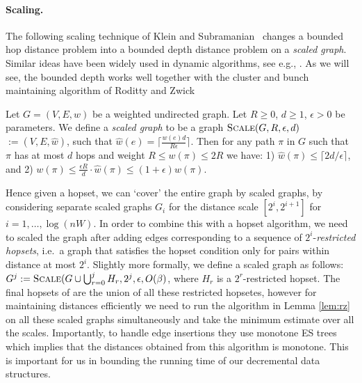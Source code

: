 \paragraph{Scaling.}
The following scaling technique of Klein and Subramanian~\cite{KS97} changes a bounded hop distance problem into a bounded depth distance problem on a \textit{scaled graph}. Similar ideas have been widely used in dynamic algorithms, see e.g., \cite{Bernstein09,BR11,henzinger2014decremental,LN2020}. As we will see, the bounded depth works well together with the cluster and bunch maintaining algorithm of Roditty and Zwick~\cite{RZ12}
\begin{lemma}[\cite{KS97}]\label{lem:rounding}
Let $G=(V,E,w)$ be a weighted undirected graph. Let $R \geq 0$, $d \geq 1$, $\epsilon > 0$ be parameters.
We define a \emph{scaled graph} to be a graph $\textsc{Scale}(G, R, \epsilon, d)$ $:=  (V, E, \hat{w})$, such that $\hat{w}(e) = \lceil \tfrac{w(e)d}{R \epsilon} \rceil$.
Then for any path $\pi$ in $G$ such that $\pi$ has at most $d$ hops and weight $R \leq w(\pi) \leq 2R$ we have: 1) $\hat{w}(\pi) \leq \lceil 2d/\epsilon \rceil$, and 2) $w(\pi) \leq \tfrac{\epsilon R}{d} \cdot \hat{w}(\pi) \leq (1+\epsilon) w(\pi)$.
\end{lemma}

Hence given a hopset, we can `cover' the entire graph by scaled graphs, by considering separate scaled graphs $G_i$ for the distance scale $[2^i, 2^{i+1}]$ for $i=1,\dots, \log(nW)$. In order to combine this with a hopset algorithm, we need to scaled the graph after adding edges corresponding to a sequence of $2^i$-\textit{restricted hopsets}, i.e.~a graph that satisfies the hopset condition only for pairs within distance at most $2^i$. Slightly more formally, we define a scaled graph
as follows: $G^j := \textsc{Scale}(G \cup \bigcup_{r=0}^{j} H_{r}, 2^j, \epsilon, O(\beta)$, where $H_{r}$ is a $2^r$-restricted hopset. The final hopsets of \cite{LN2020} are the union of all these restricted hopsetes, however for maintaining distances efficiently we need to run the algorithm in Lemma \ref{lem:rz} on all these scaled graphs simultaneously and take the minimum estimate over all the scales. Importantly, to handle edge insertions they use monotone ES trees which implies that the distances obtained from this algorithm is monotone. This is important for us in bounding the running time of our decremental data structures.


